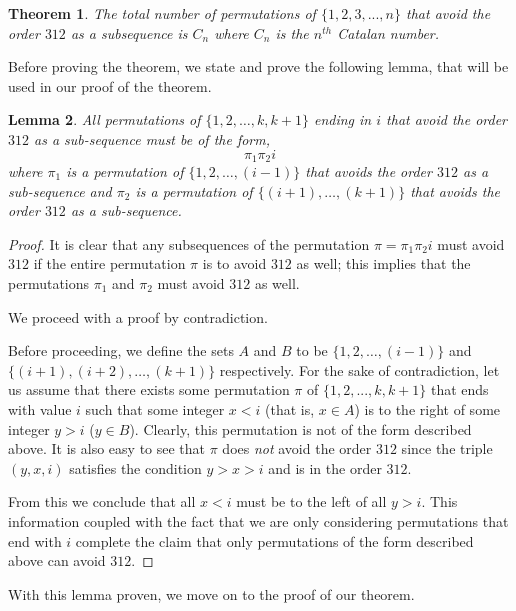 \documentclass[11pt,letterpaper,twoside,english]{article}
\theoremstyle{theorem}
\newtheorem{theorem}{Theorem}
\newtheorem{lemma}[theorem]{Lemma}
\theoremstyle{remark}
\begin{document}
\begin{theorem}
The total number of permutations of $\{1,2,3,...,n\}$ that avoid the order $312$ as a subsequence is $C_n$ where $C_n$ is the $n^{th}$ Catalan number.
\end{theorem}

Before proving the theorem, we state and prove the following lemma, that will be used in our proof of the theorem.
\begin{lemma}
\label{lemma1}
All permutations of $\{1,2,\dots,k,k+1\}$ ending in $i$ that avoid the order $312$ as a sub-sequence must be of the form,
$$\pi_1 \pi_2 i$$
where $\pi_1$ is a permutation of $\{1,2,\ldots,(i-1)\}$ that avoids the order $312$ as a sub-sequence and $\pi_2$ is a permutation of $\{(i+1),\ldots,(k+1)\}$ that avoids the order $312$ as a sub-sequence.
\end{lemma}

\begin{proof}
It is clear that any subsequences of the permutation $\pi = \pi_1 \pi_2 i$ must avoid $312$ if the entire permutation $\pi$ is to avoid $312$ as well; this implies that the permutations $\pi_1$ and $\pi_2$ must avoid $312$ as well.

We proceed with a proof by contradiction.

Before proceeding, we define the sets $A$ and $B$ to be $\{1,2,\ldots,(i-1)\}$ and $\{(i+1),(i+2),\ldots,(k+1)\}$ respectively. For the sake of contradiction, let us assume that there exists some permutation $\pi$ of $\{1,2,...,k,k+1\}$ that ends with value $i$ such that some integer $x < i$ (that is, $x \in A$) is to the right of some integer $y > i$ ($y \in B$). Clearly, this permutation is not of the form described above. It is also easy to see that $\pi$ does \emph{not} avoid the order $312$ since the triple $(y, x, i)$ satisfies the condition $y > x > i$ and is in the order $312$.

From this we conclude that all $x < i$ must be to the left of all $y > i$. This information coupled with the fact that we are only considering permutations that end with $i$ complete the claim that only permutations of the form described above can avoid $312$.

\end{proof}

With this lemma proven, we move on to the proof of our theorem.
\end{document}
